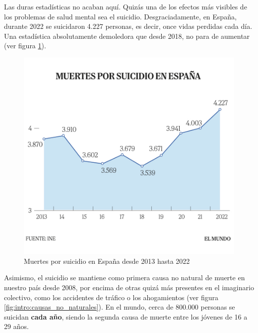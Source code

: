 Las duras estadísticas no acaban aquí. Quizás una de los efectos más visibles de los problemas de salud mental sea el suicidio. Desgraciadamente, en España, durante 2022 se suicidaron 4.227 personas, es decir, once vidas perdidas cada día. Una estadística absolutamente demoledora que desde 2018, no para de aumentar (ver figura \ref{fig:intro:muertes_suicidio}).

\begin{figure}[h]
    \centering
    \includegraphics[width=0.66\linewidth]{figures/muertes_suicidio.jpg}
    \caption[Muertes por suicidio en España desde 2013 hasta 2022]{Muertes por suicidio en España desde 2013 hasta 2022 \cite{saiz_4227_2023}}
    \label{fig:intro:muertes_suicidio}
\end{figure}

Asimismo, el suicidio se mantiene como primera causa no natural de muerte en nuestro país desde 2008, por encima de otras quizá más presentes en el imaginario colectivo, como los accidentes de tráfico o los ahogamientos (ver figura \ref{fig:intro:causas_no_naturales}).  En el mundo, cerca de 800.000 personas se suicidan \textbf{cada año}, siendo la segunda causa de muerte entre los jóvenes de 16 a 29 años. \cite{confederacion_salud_mental_espana_salud_nodate}

